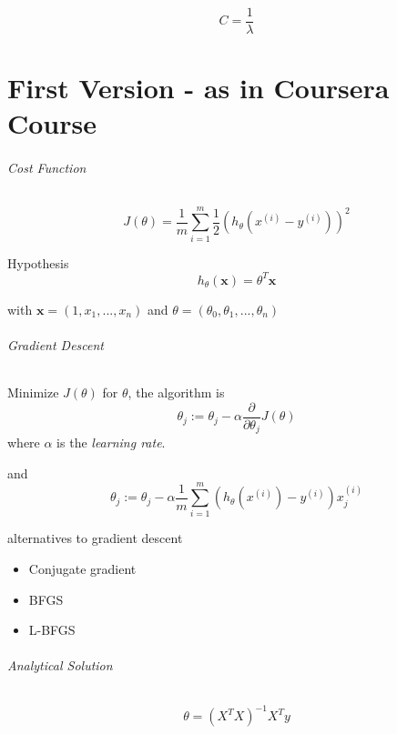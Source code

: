 \documentclass[a4paper,titlepage] {scrartcl}
\begin{document}
\begin{equation}
	C = \frac{1}{\lambda}
\end{equation}

\part{First Version - as in Coursera Course}

\paragraph{Cost Function} %
\label{par:cost_function}
\begin{equation}
	J(\theta) = \frac{1}{m}\sum_{i=1}^m \frac{1}{2}(h_\theta(x^{(i)}-y^{(i)}))^2
\end{equation}

Hypothesis
\begin{equation}
	h_\theta(\mathbf{x}) = \theta^T\mathbf{x} 
\end{equation}

with $\mathbf{x}=(1,x_1,...,x_n)$ and $\theta=(\theta_0, \theta_1, ...,\theta_n)$

\paragraph{Gradient Descent} %
\label{par:gradient_descent}
Minimize $J(\theta)$ for $\theta$, the algorithm is
\begin{equation}
	\theta_j:= \theta_j -\alpha\frac{\partial}{\partial\theta_j}J(\theta)
\end{equation}
where $\alpha$ is the \emph{learning rate}.

and 
\begin{equation}
	\theta_j := \theta_j -\alpha\frac{1}{m}\sum_{i=1}^m(h_\theta(x^{(i)})-y^{(i)})x_j^{(i)}
\end{equation}



alternatives to gradient descent
\begin{itemize}
	\item Conjugate gradient
	\item BFGS
	\item L-BFGS
\end{itemize}


\paragraph{Analytical Solution} %
\label{par:analytical_solution}
\begin{equation}
	\theta = (X^TX)^{-1}X^Ty
\end{equation}
\end{document}
